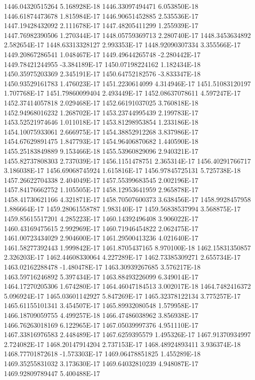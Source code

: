 1446.04320515264  5.168928E-18
1446.33097494471  6.053850E-18
1446.61874473678  1.815984E-17
1446.90651452885  2.535536E-17
1447.19428432092  2.111678E-17
1447.48205411299  1.255939E-17
1447.76982390506  1.270344E-17
1448.05759369713  2.280740E-17
1448.3453634892  2.582654E-17
1448.63313328127  2.993353E-17
1448.92090307334  3.355566E-17
1449.20867286541  1.048467E-17
1449.49644265748  -2.280442E-17
1449.78421244955  -3.384189E-17
1450.07198224162  1.182434E-18
1450.35975203369  2.345191E-17
1450.64752182576  -3.833347E-18
1450.93529161783  1.476023E-17
1451.2230614099  4.314946E-17
1451.51083120197  1.707768E-17
1451.79860099404  2.493449E-17
1452.08637078611  4.597247E-17
1452.37414057818  2.029468E-17
1452.66191037025  3.760818E-18
1452.94968016232  1.268702E-17
1453.23744995439  2.199783E-17
1453.52521974646  1.011018E-17
1453.81298953854  1.233186E-18
1454.10075933061  2.666975E-17
1454.38852912268  3.837986E-17
1454.67629891475  1.847793E-17
1454.96406870682  1.440590E-18
1455.25183849889  9.153466E-18
1455.53960829096  2.940321E-17
1455.82737808303  2.737039E-17
1456.1151478751  2.365314E-17
1456.40291766717  3.186038E-17
1456.69068745924  1.615816E-17
1456.97845725131  5.725738E-18
1457.26622704338  2.404049E-17
1457.55399683545  2.002196E-17
1457.84176662752  1.105505E-17
1458.12953641959  2.965878E-17
1458.41730621166  4.321871E-17
1458.70507600373  3.638456E-17
1458.9928457958  1.886664E-17
1459.28061558787  1.983140E-17
1459.56838537994  3.568875E-17
1459.85615517201  4.285223E-17
1460.14392496408  3.906022E-17
1460.43169475615  2.992969E-17
1460.71946454822  2.062475E-17
1461.00723434029  2.904600E-17
1461.29500413236  4.021640E-17
1461.58277392443  1.999842E-17
1461.8705437165  8.970100E-18
1462.15831350857  2.326203E-17
1462.44608330064  4.227289E-17
1462.73385309271  2.655734E-17
1463.02162288478  -1.480478E-17
1463.30939267685  3.576217E-18
1463.59716246892  5.397434E-17
1463.88493226099  6.349014E-17
1464.17270205306  1.674280E-17
1464.46047184513  3.002017E-18
1464.7482416372  5.096924E-17
1465.03601142927  5.847269E-17
1465.32378122134  3.775257E-17
1465.61155101341  3.454507E-17
1465.89932080548  1.579958E-17
1466.18709059755  4.499257E-18
1466.47486038962  3.856938E-17
1466.76263018169  6.122965E-17
1467.05039997376  4.951110E-17
1467.33816976583  2.448489E-17
1467.6259395579  1.495326E-17
1467.91370934997  2.724082E-17
1468.20147914204  2.737153E-17
1468.48924893411  3.936374E-18
1468.77701872618  -1.573303E-17
1469.06478851825  1.455289E-18
1469.35255831032  3.173630E-17
1469.64032810239  4.948087E-17
1469.92809789447  5.400488E-17
